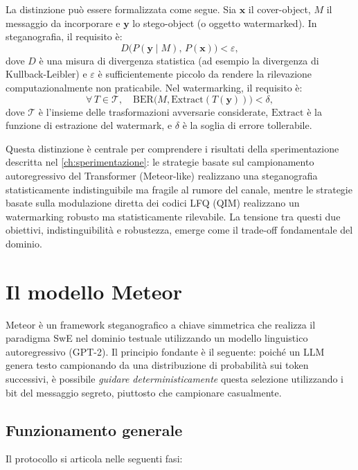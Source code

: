 La distinzione può essere formalizzata come segue. Sia $\mathbf{x}$ il cover-object, $M$ il messaggio da incorporare e $\mathbf{y}$ lo stego-object (o oggetto watermarked). In steganografia, il requisito è:
\[
D\bigl(P(\mathbf{y} \mid M),\, P(\mathbf{x})\bigr) < \varepsilon,
\]
dove $D$ è una misura di divergenza statistica (ad esempio la divergenza di Kullback-Leibler) e $\varepsilon$ è sufficientemente piccolo da rendere la rilevazione computazionalmente non praticabile. Nel watermarking, il requisito è:
\[
\forall\, T \in \mathcal{T},\quad \mathrm{BER}\bigl(M, \mathrm{Extract}(T(\mathbf{y}))\bigr) < \delta,
\]
dove $\mathcal{T}$ è l'insieme delle trasformazioni avversarie considerate, $\mathrm{Extract}$ è la funzione di estrazione del watermark, e $\delta$ è la soglia di errore tollerabile.

Questa distinzione è centrale per comprendere i risultati della sperimentazione descritta nel \autoref{ch:sperimentazione}: le strategie basate sul campionamento autoregressivo del Transformer (Meteor-like) realizzano una steganografia statisticamente indistinguibile ma fragile al rumore del canale, mentre le strategie basate sulla modulazione diretta dei codici LFQ (QIM) realizzano un watermarking robusto ma statisticamente rilevabile. La tensione tra questi due obiettivi, indistinguibilità e robustezza, emerge come il trade-off fondamentale del dominio.

\section{Il modello Meteor}

Meteor \cite{kaptchuk-2021} è un framework steganografico a chiave simmetrica che realizza il paradigma SwE nel dominio testuale utilizzando un modello linguistico autoregressivo (GPT-2). Il principio fondante è il seguente: poiché un LLM genera testo campionando da una distribuzione di probabilità sui token successivi, è possibile \emph{guidare deterministicamente} questa selezione utilizzando i bit del messaggio segreto, piuttosto che campionare casualmente.

\subsection{Funzionamento generale}

Il protocollo si articola nelle seguenti fasi:

